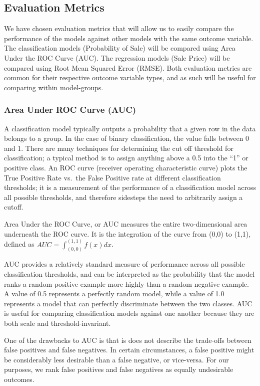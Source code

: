 \documentclass[12pt,]{article}
\begin{document}
\subsection{Evaluation Metrics}\label{evaluation-metrics}

We have chosen evaluation metrics that will allow us to easily compare
the performance of the models against other models with the same outcome
variable. The classification models (Probability of Sale) will be
compared using Area Under the ROC Curve (AUC). The regression models
(Sale Price) will be compared using Root Mean Squared Error (RMSE). Both
evaluation metrics are common for their respective outcome variable
types, and as such will be useful for comparing within model-groups.

\subsubsection{Area Under ROC Curve
(AUC)}\label{area-under-roc-curve-auc}

A classification model typically outputs a probability that a given row
in the data belongs to a group. In the case of binary classification,
the value falls between 0 and 1. There are many techniques for
determining the cut off threshold for classification; a typical method
is to assign anything above a 0.5 into the ``1'' or positive class. An
ROC curve (receiver operating characteristic curve) plots the True
Positive Rate vs.~the False Positive rate at different classification
thresholds; it is a measurement of the performance of a classification
model across all possible thresholds, and therefore sidesteps the need
to arbitrarily assign a cutoff.

Area Under the ROC Curve, or AUC measures the entire two-dimensional
area underneath the ROC curve. It is the integration of the curve from
(0,0) to (1,1), defined as \(AUC = \int_{(0,0)}^{(1,1)} f(x)dx\).

AUC provides a relatively standard measure of performance across all
possible classification thresholds, and can be interpreted as the
probability that the model ranks a random positive example more highly
than a random negative example. A value of 0.5 represents a perfectly
random model, while a value of 1.0 represents a model that can perfectly
discriminate between the two classes. AUC is useful for comparing
classification models against one another because they are both scale
and threshold-invariant.

One of the drawbacks to AUC is that is does not describe the trade-offs
between false positives and false negatives. In certain circumstances, a
false positive might be considerably less desirable than a false
negative, or vice-versa. For our purposes, we rank false positives and
false negatives as equally undesirable outcomes.
\end{document}
